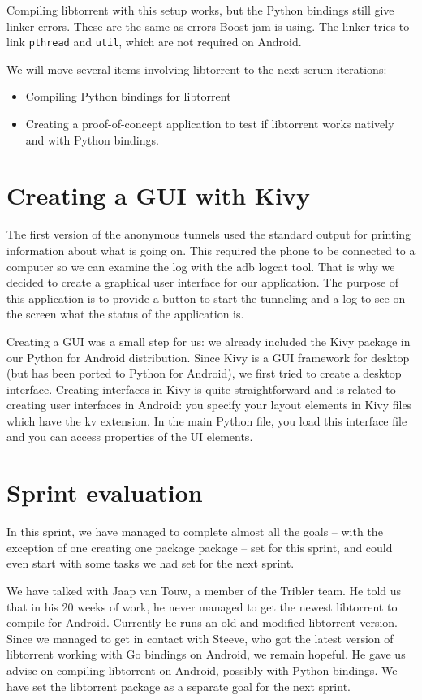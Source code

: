 		Compiling libtorrent with this setup works, but the Python bindings still give linker errors. These are the same as errors Boost jam is using. The linker tries to link \texttt{pthread} and \texttt{util}, which are not required on Android.
		
		We will move several items involving libtorrent to the next scrum iterations:
		\begin{itemize}
		\item Compiling Python bindings for libtorrent
		\item Creating a proof-of-concept application to test if libtorrent works natively and with Python bindings.
		\end{itemize}
	
	\section{Creating a GUI with Kivy}
		The first version of the anonymous tunnels used the standard output for printing information about what is going on. This required the phone to be connected to a computer so we can examine the log with the adb logcat tool. That is why we decided to create a graphical user interface for our application. The purpose of this application is to provide a button to start the tunneling and a log to see on the screen what the status of the application is.
	
		Creating a GUI was a small step for us: we already included the Kivy package in our Python for Android distribution. Since Kivy is a GUI framework for desktop (but has been ported to Python for Android), we first tried to create a desktop interface. Creating interfaces in Kivy is quite straightforward and is related to creating user interfaces in Android: you specify your layout elements in Kivy files which have the kv extension. In the main Python file, you load this interface file and you can access properties of the UI elements.
	
	\section{Sprint evaluation}
		In this sprint, we have managed to complete almost all the goals -- with the exception of one creating one package package -- set for this sprint, and could even start with some tasks we had set for the next sprint.
		
		We have talked with Jaap van Touw, a member of the Tribler team. He told us that in his 20 weeks of work, he never managed to get the newest libtorrent to compile for Android.
		Currently he runs an old and modified libtorrent version. Since we managed to get in contact with Steeve, who got the latest version of libtorrent working with Go bindings on Android, we remain hopeful. He gave us advise on compiling libtorrent on Android, possibly with Python bindings. We have set the libtorrent package as a separate goal for the next sprint.
